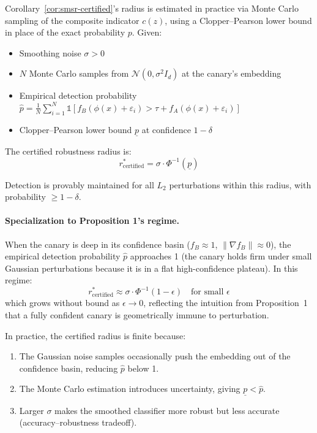 Corollary~\ref{cor:smsr-certified}'s radius is estimated in practice via Monte Carlo sampling of the composite indicator $c(z)$, using a Clopper--Pearson lower bound in place of the exact probability $p$. Given:
\begin{itemize}
\item Smoothing noise $\sigma > 0$
\item $N$ Monte Carlo samples from $\mathcal{N}(0, \sigma^2 I_d)$ at the canary's embedding
\item Empirical detection probability $\hat{p} = \frac{1}{N}\sum_{i=1}^N \mathbb{1}[f_B(\phi(x) + \varepsilon_i) > \tau + f_A(\phi(x) + \varepsilon_i)]$
\item Clopper--Pearson lower bound $\underline{p}$ at confidence $1 - \delta$
\end{itemize}

The certified robustness radius is:
\begin{equation}
\label{eq:certified-radius}
\boxed{r^*_{\text{certified}} = \sigma \cdot \Phi^{-1}(\underline{p})}
\end{equation}

Detection is provably maintained for all $L_2$ perturbations within this radius, with probability $\geq 1 - \delta$.

\paragraph{Specialization to Proposition 1's regime.} When the canary is deep in its confidence basin ($f_B \approx 1$, $\|\nabla f_B\| \approx 0$), the empirical detection probability $\hat{p}$ approaches 1 (the canary holds firm under small Gaussian perturbations because it is in a flat high-confidence plateau). In this regime:
\[
r^*_{\text{certified}} \approx \sigma \cdot \Phi^{-1}(1 - \epsilon) \quad \text{for small } \epsilon
\]
which grows without bound as $\epsilon \to 0$, reflecting the intuition from Proposition~1 that a fully confident canary is geometrically immune to perturbation.

In practice, the certified radius is finite because:
\begin{enumerate}
\item The Gaussian noise samples occasionally push the embedding out of the confidence basin, reducing $\hat{p}$ below 1.
\item The Monte Carlo estimation introduces uncertainty, giving $\underline{p} < \hat{p}$.
\item Larger $\sigma$ makes the smoothed classifier more robust but less accurate (accuracy--robustness tradeoff).
\end{enumerate}

